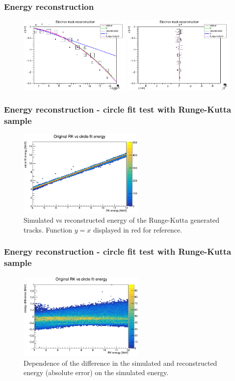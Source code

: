 \documentclass{beamer}
\begin{document}
	\begin{frame}
	\frametitle{Energy reconstruction}
		\begin{figure}
			\centering
			\includegraphics[width=0.49\textwidth]{../images/track_fits_xz.png}
			\includegraphics[width=0.49\textwidth]{../images/track_fits_yz.png}
		\end{figure}
	\end{frame}
	\begin{frame}
	\frametitle{Energy reconstruction - circle fit test with Runge-Kutta sample}
		\begin{figure}
			\centering
			\includegraphics[width=0.55\textwidth]{../images/rk_energy.png}
			\caption{Simulated vs reconstructed energy of the Runge-Kutta generated tracks. Function $y=x$ displayed in red for reference.}
		\end{figure}
	\end{frame}
	\begin{frame}
	\frametitle{Energy reconstruction - circle fit test with Runge-Kutta sample}
		\begin{figure}
			\centering
			\includegraphics[width=0.55\textwidth]{../images/rk_energy_diff.png}
			\caption{Dependence of the difference in the simulated and reconstructed energy (absolute error) on the simulated energy.}
		\end{figure}
	\end{frame}
\end{document}
